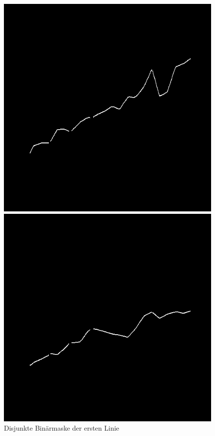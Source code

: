\begin{figure}[h!] %
    \centering
    \begin{minipage}{0.315\textwidth} %
        \centering
        \includegraphics[width=\linewidth]{Implementation/img/alg_layer1.png}
        \caption{ Disjunkte Binärmaske der ersten Linie}
        \label{fig:alg_layer1}
    \end{minipage}\hfill %
    \begin{minipage}{0.315\textwidth} %
        \centering
        \includegraphics[width=\linewidth]{Implementation/img/alg_layer2.png}

\end{minipage}
\end{figure}
